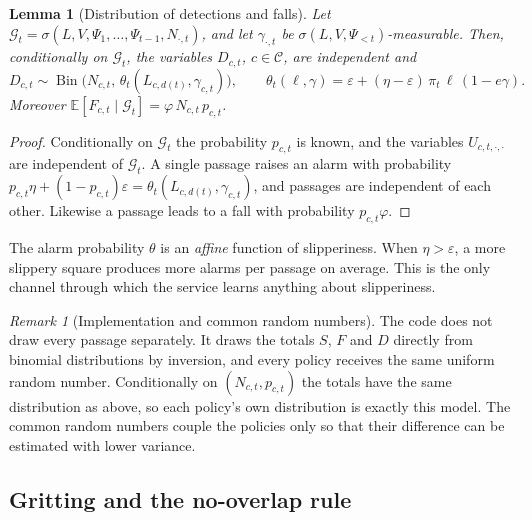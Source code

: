 \documentclass[11pt,a4paper]{article}
\theoremstyle{plain}
\newtheorem{lemma}{Lemma}
\theoremstyle{definition}
\theoremstyle{remark}
\newtheorem{huomautus}{Remark}
\newcommand{\E}{\mathbb{E}}
\newcommand{\cC}{\mathcal{C}}
\newcommand{\cG}{\mathcal{G}}
\newcommand{\1}{\mathbf{1}}
\newcommand{\Bin}{\operatorname{Bin}}
\begin{document}
\begin{lemma}[Distribution of detections and falls]\label{le:havainnot}
Let $\cG_t = \sigma(L, V, \Psi_1, \dots, \Psi_{t-1}, N_{\cdot,t})$, and let
$\gamma_{\cdot,t}$ be $\sigma(L, V, \Psi_{<t})$-measurable. Then, conditionally on
$\cG_t$, the variables $D_{c,t}$, $c \in \cC$, are independent and
\[
  D_{c,t} \sim \Bin\bigl(N_{c,t},\, \theta_t(L_{c,d(t)}, \gamma_{c,t})\bigr),
  \qquad
  \theta_t(\ell, \gamma) = \varepsilon + (\eta - \varepsilon)\, \pi_t\, \ell\, (1 - e \gamma).
\]
Moreover $\E[F_{c,t} \mid \cG_t] = \varphi\, N_{c,t}\, p_{c,t}$.
\end{lemma}

\begin{proof}
Conditionally on $\cG_t$ the probability $p_{c,t}$ is known, and the variables
$U_{c,t,\cdot,\cdot}$ are independent of $\cG_t$. A single passage raises an alarm
with probability
$p_{c,t}\eta + (1 - p_{c,t})\varepsilon = \theta_t(L_{c,d(t)}, \gamma_{c,t})$, and
passages are independent of each other. Likewise a passage leads to a fall with
probability $p_{c,t}\varphi$.
\end{proof}

\begin{intuitio}
The alarm probability $\theta$ is an \emph{affine} function of slipperiness. When
$\eta > \varepsilon$, a more slippery square produces more alarms per passage on
average. This is the only channel through which the service learns anything
about slipperiness.
\end{intuitio}

\begin{huomautus}[Implementation and common random numbers]\label{hu:crn}
The code does not draw every passage separately. It draws the totals $S$, $F$
and $D$ directly from binomial distributions by inversion, and every policy
receives the same uniform random number. Conditionally on $(N_{c,t}, p_{c,t})$ the
totals have the same distribution as above, so each policy's own distribution is
exactly this model. The common random numbers couple the policies only so that
their difference can be estimated with lower variance.
\end{huomautus}

\subsection{Gritting and the no-overlap rule}\label{sec:huolto}
\end{document}
